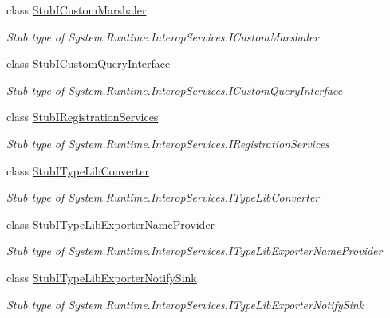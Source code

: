 \begin{DoxyCompactItemize}
class \hyperlink{class_system_1_1_runtime_1_1_interop_services_1_1_fakes_1_1_stub_i_custom_marshaler}{Stub\-I\-Custom\-Marshaler}
\begin{DoxyCompactList}\small\item\em Stub type of System.\-Runtime.\-Interop\-Services.\-I\-Custom\-Marshaler\end{DoxyCompactList}\item 
class \hyperlink{class_system_1_1_runtime_1_1_interop_services_1_1_fakes_1_1_stub_i_custom_query_interface}{Stub\-I\-Custom\-Query\-Interface}
\begin{DoxyCompactList}\small\item\em Stub type of System.\-Runtime.\-Interop\-Services.\-I\-Custom\-Query\-Interface\end{DoxyCompactList}\item 
class \hyperlink{class_system_1_1_runtime_1_1_interop_services_1_1_fakes_1_1_stub_i_registration_services}{Stub\-I\-Registration\-Services}
\begin{DoxyCompactList}\small\item\em Stub type of System.\-Runtime.\-Interop\-Services.\-I\-Registration\-Services\end{DoxyCompactList}\item 
class \hyperlink{class_system_1_1_runtime_1_1_interop_services_1_1_fakes_1_1_stub_i_type_lib_converter}{Stub\-I\-Type\-Lib\-Converter}
\begin{DoxyCompactList}\small\item\em Stub type of System.\-Runtime.\-Interop\-Services.\-I\-Type\-Lib\-Converter\end{DoxyCompactList}\item 
class \hyperlink{class_system_1_1_runtime_1_1_interop_services_1_1_fakes_1_1_stub_i_type_lib_exporter_name_provider}{Stub\-I\-Type\-Lib\-Exporter\-Name\-Provider}
\begin{DoxyCompactList}\small\item\em Stub type of System.\-Runtime.\-Interop\-Services.\-I\-Type\-Lib\-Exporter\-Name\-Provider\end{DoxyCompactList}\item 
class \hyperlink{class_system_1_1_runtime_1_1_interop_services_1_1_fakes_1_1_stub_i_type_lib_exporter_notify_sink}{Stub\-I\-Type\-Lib\-Exporter\-Notify\-Sink}
\begin{DoxyCompactList}\small\item\em Stub type of System.\-Runtime.\-Interop\-Services.\-I\-Type\-Lib\-Exporter\-Notify\-Sink\end{DoxyCompactList}\item 

\end{DoxyCompactItemize}
